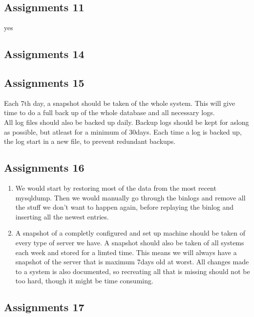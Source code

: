 \subsection{Assignments 11} 
yes

\subsection{Assignments 14} 

\subsection{Assignments 15}
Each 7th day, a snapshot should be taken of the whole system. This will give time to do a full back up of the whole database and all necessary logs.\\
All log files should also be backed up daily. Backup logs should be kept for aslong as possible, but atleast for a minimum of 30days. Each time a log is backed up, the log start in a new file, to prevent redundant backups.

\subsection{Assignments 16}
\begin{enumerate}
\item We would start by restoring most of the data from the most recent mysqldump. Then we would manually go through the binlogs and remove all the stuff we don't want to happen again, before replaying the binlog and inserting all the newest entries.
\item A snapshot of a completly configured and set up machine should be taken of every type of server we have. A snapshot should also be taken of all systems each week and stored for a limted time. This means we will always have a snapshot of the server that is maximum 7days old at worst. All changes made to a system is also documented, so recreating all that is missing should not be too hard, though it might be time consuming.
\end{enumerate}

\subsection{Assignments 17}
